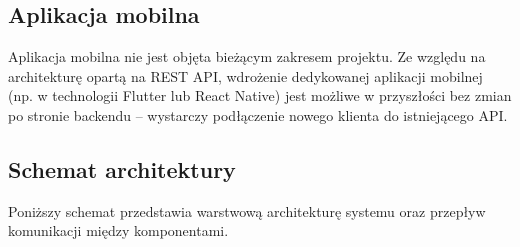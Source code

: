 \documentclass[a4paper,12pt]{article}
\begin{document}
\subsection{Aplikacja mobilna}
 
Aplikacja mobilna nie jest objęta bieżącym zakresem projektu. Ze względu na architekturę opartą na REST API, wdrożenie dedykowanej aplikacji mobilnej (np. w technologii Flutter lub React Native) jest możliwe w przyszłości bez zmian po stronie backendu -- wystarczy podłączenie nowego klienta do istniejącego API.
 
\subsection{Schemat architektury}
 
Poniższy schemat przedstawia warstwową architekturę systemu oraz przepływ komunikacji między komponentami.
 
\end{document}
